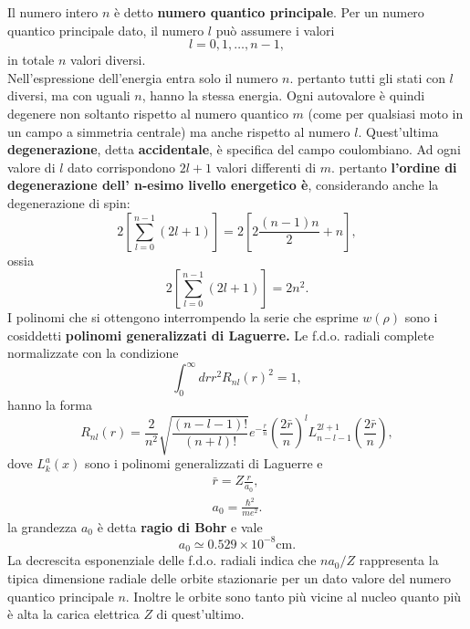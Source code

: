 \documentclass[a4paper,12pt,oneside]{book}
\begin{document}
Il numero intero $n$ è detto \textbf{numero quantico principale}. Per un numero quantico principale dato, il numero $l$ può assumere i valori
\begin{equation}
l=0,1,\dots,n-1,
\end{equation}
in totale $n$ valori diversi.\\
Nell'espressione dell'energia entra solo il numero $n$. pertanto tutti gli stati con $l$ diversi, ma con uguali $n$, hanno la stessa energia. Ogni autovalore è quindi degenere non soltanto rispetto al numero quantico $m$ (come per qualsiasi moto in un campo a simmetria centrale) ma anche rispetto al numero $l$. Quest'ultima \textbf{degenerazione}, detta \textbf{accidentale}, è specifica del campo coulombiano. Ad ogni valore di $l$ dato corrispondono $2l+1$ valori differenti di $m$. pertanto \textbf{l'ordine di degenerazione dell' n-esimo livello energetico è}, considerando anche la degenerazione di spin:
\begin{equation}
2 \left[ \sum _{l=0} ^{n-1} \left(2l+1 \right)\right]=2 \left[ 2\frac{\left( n-1 \right) n}{2}+n\right],
\end{equation}
ossia
\begin{equation}
2 \left[ \sum _{l=0} ^{n-1} \left(2l+1 \right)\right]= 2n^2.
\end{equation}
I polinomi che si ottengono interrompendo la serie che esprime $w(\rho)$ sono i cosiddetti \textbf{polinomi generalizzati di Laguerre.} Le f.d.o. radiali complete normalizzate con la condizione
\begin{equation}
\int _0 ^{\infty} dr r^2 {R_{nl} (r)}^2=1,
\end{equation}
hanno la forma
\begin{equation}
R_{nl}(r) =\frac{2}{n^2}\sqrt{\frac{\left(n-l-1\right) !}{\left(n+l\right) !}} e^{-\frac{\bar{r}}{n}}\left(\frac{2\bar{r}}{n}\right) ^l L_{n-l-1} ^{2l+1} \left(\frac{2\bar{r}}{n}\right) ,
\end{equation}
dove $L_k ^a (x)$ sono i polinomi generalizzati di Laguerre e
\begin{eqnarray}
\bar{r}= Z\frac{r}{a_0},\\
a_0= \frac{\hbar ^2}{me^2}.
\end{eqnarray}
la grandezza $a_0$ è detta \textbf{ragio di Bohr} e vale
\begin{equation}
a_0 \simeq 0.529 \times 10^{-8} \textrm{cm}.
\end{equation}
La decrescita esponenziale delle f.d.o. radiali indica che $n a_0/Z$ rappresenta la tipica dimensione radiale delle orbite stazionarie per un dato valore del numero quantico principale $n$. Inoltre le orbite sono tanto più vicine al nucleo quanto più è alta la carica elettrica $Z$ di quest'ultimo.\\
\end{document}
